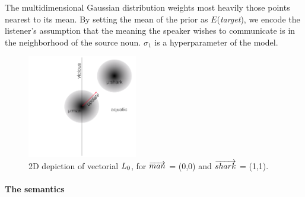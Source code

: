 \documentclass[9pt,twocolumn,twoside,lineno]{pnas-new}
\begin{document}
		
		

		The multidimensional Gaussian distribution weights most heavily those points nearest to its mean. By setting the mean of the prior as $E$(\emph{target}), we encode the listener's assumption that the meaning the speaker wishes to communicate is in the neighborhood of the source noun. $\sigma_1$ is a hyperparameter of the model.

		\begin{figure}[htbp]
		\centering
		\includegraphics[height=4.5cm]{images/diagram1.png}
		   
		  \caption{2D depiction of vectorial $L\protect_0$, for $\protect\overrightarrow{man}$ = (0,0) and $\protect\overrightarrow{shark}$ = (1,1).}
		  \label{fig:2d}
		\end{figure}


			


	\paragraph{The semantics}
\end{document}
